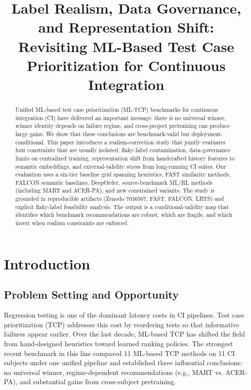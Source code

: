 \documentclass[conference]{IEEEtran}
\title{Label Realism, Data Governance, and Representation Shift:\\Revisiting ML-Based Test Case Prioritization for Continuous Integration}
\author{}
\begin{document}
\maketitle
\begin{abstract}
Unified ML-based test case prioritization (ML-TCP) benchmarks for continuous integration (CI) have delivered an important message: there is no universal winner, winner identity depends on failure regime, and cross-project pretraining can produce large gains. We show that these conclusions are benchmark-valid but deployment-conditional. This paper introduces a realism-correction study that jointly evaluates four constraints that are usually isolated: flaky-label contamination, data-governance limits on centralized training, representation shift from handcrafted history features to semantic embeddings, and external-validity stress from long-running CI suites. Our evaluation uses a six-tier baseline grid spanning heuristics, FAST similarity methods, FALCON semantic baselines, DeepOrder, source-benchmark ML/RL methods (including MART and ACER-PA), and new constrained variants. The study is grounded in reproducible artifacts (Zenodo 7036507, FAST, FALCON, LRTS) and explicit flaky-label feasibility analysis. The output is a conditional-validity map that identifies which benchmark recommendations are robust, which are fragile, and which invert when realism constraints are enforced.
\end{abstract}







\section{Introduction}

\subsection{Problem Setting and Opportunity}

Regression testing is one of the dominant latency costs in CI pipelines. Test case prioritization (TCP) addresses this cost by reordering tests so that informative failures appear earlier. Over the last decade, ML-based TCP has shifted the field from hand-designed heuristics toward learned ranking policies. The strongest recent benchmark in this line compared 11 ML-based TCP methods on 11 CI subjects under one unified pipeline and established three influential conclusions: no universal winner, regime-dependent recommendations (e.g., MART vs. ACER-PA), and substantial gains from cross-subject pretraining.
\end{document}
